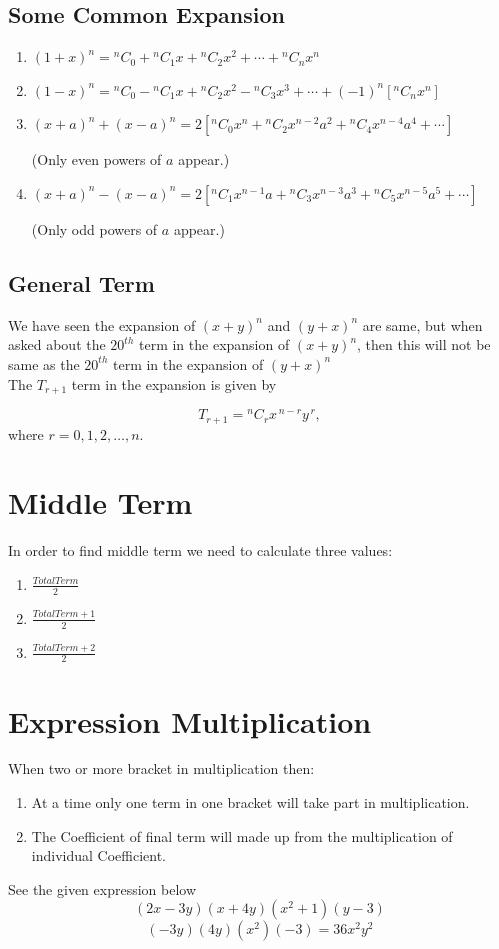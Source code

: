\documentclass[12pt]{article}
\begin{document}
\subsection{Some Common Expansion}
\begin{enumerate}
    \item $(1+x)^n = {}^{n}C_{0}
    + {}^{n}C_{1}x
    + {}^{n}C_{2}x^2
    + \cdots
    + {}^{n}C_{n}x^n$

    \item $(1-x)^n = {}^{n}C_{0}
    - {}^{n}C_{1}x
    + {}^{n}C_{2}x^2
    - {}^{n}C_{3}x^3
    + \cdots
    + (-1)^n[ {}^{n}C_{n}x^n]$

    \item $(x+a)^{n} + (x-a)^{n}
    = 2\left[
    {}^{n}C_{0}x^n
    + {}^{n}C_{2}x^{n-2}a^2
    + {}^{n}C_{4}x^{n-4}a^4
    + \cdots
    \right]$

    (Only even powers of $a$ appear.)

    \item $(x+a)^{n} - (x-a)^{n}
    = 2\left[
    {}^{n}C_{1}x^{n-1}a
    + {}^{n}C_{3}x^{n-3}a^3
    + {}^{n}C_{5}x^{n-5}a^5
    + \cdots
    \right]$

    (Only odd powers of $a$ appear.)
\end{enumerate}
\subsection{General Term}
We have seen the expansion of $(x+y)^n$ and $(y+x)^n$ are same, but when asked about the $20^{th}$ term in the expansion of $(x+y)^n$, then this will not be same as the $20^{th}$ term in the expansion of $(y+x)^n$\\
The $T_{r+1}$ term in the expansion is given by

\[
\boxed{
T_{r+1} = {}^{n}C_{r} x^{\,n-r} y^{\,r},
}
\]
where \( r = 0,1,2,\dots,n \).

\section*{Middle Term}
In order to find middle term we need to calculate three values: 
\begin{enumerate}
    \item $\frac{Total Term}{2}$
    \item $\frac{Total Term+1}{2}$
    \item $\frac{Total Term+2}{2}$
\end{enumerate}

\section*{Expression Multiplication}
When two or more bracket in multiplication then: 
\begin{enumerate}
    \item At a time only one term in one bracket will take part in multiplication.
    \item The Coefficient of final term will made up from the multiplication of individual Coefficient.
\end{enumerate}
See the given expression below \[
(2x-3y)(x+4y)(x^2+1)(y-3) 
\]
\[
(-3y)(4y)(x^2)(-3) = 36x^2y^2
\]
\end{document}
